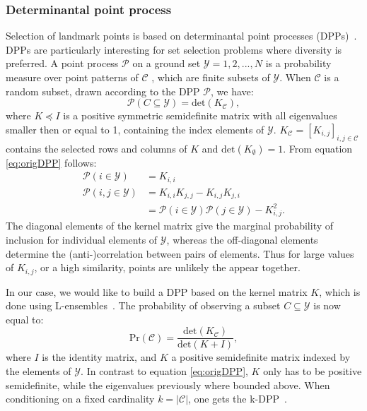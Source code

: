 \documentclass[preprint,12pt]{elsarticle}
\begin{document}
	\subsubsection{Determinantal point process}
	Selection of landmark points is based on determinantal point processes (DPPs)~\cite{kulesza2012determinantal}. DPPs are particularly interesting for set selection problems where diversity is preferred. A point process $\mathcal{P}$ on a ground set $\mathcal{Y} = {1,2,...,N}$ is a probability measure over point patterns of $\mathcal{C}$ , which are finite subsets of $\mathcal{Y}$. When $\mathcal{C}$ is a random subset, drawn according to the DPP $\mathcal{P}$, we have:
	\begin{equation}
	\label{eq:origDPP}
	\mathcal{P}(C \subseteq \mathcal{Y}) = \mathrm{det}(K_{\mathcal{C}}),
	\end{equation}
	where $K \preceq I$ is a positive symmetric semidefinite matrix with all eigenvalues smaller then or equal to 1, containing the index elements of $\mathcal{Y}$. $K_{\mathcal{C}} = [K_{i,j}]_{i,j \in \mathcal{C}}$ contains the selected rows and columns of $K$ and $\mathrm{det}(K_{\emptyset}) = 1$. From equation \eqref{eq:origDPP} follows:
	\begin{align}
	\mathcal{P}(i \in \mathcal{Y}) &= K_{i,i} \\
	\mathcal{P}(i,j \in \mathcal{Y}) &= K_{i,i}K_{j,j} - K_{i,j}K_{j,i}\\
	\label{eq:KDPP}
	&= \mathcal{P}(i \in \mathcal{Y})\mathcal{P}(j \in \mathcal{Y}) - K_{i,j}^2.
	\end{align}
	The diagonal elements of the kernel matrix give the marginal probability of inclusion for individual elements of $\mathcal{Y}$, whereas the off-diagonal elements determine the (anti-)correlation between pairs of elements. Thus for large values of $K_{i,j}$, or a high similarity, points are unlikely the appear together. 
	
	In our case, we would like to build a DPP based on the kernel matrix $K$, which is done using L-ensembles~\cite{borodin2009determinantal}. The probability of observing a subset $C \subseteq \mathcal{Y}$ is now equal to:
	\begin{equation}
	\mathrm{Pr}(\mathcal{C}) = \frac{\mathrm{det}(K_{\mathcal{C}})}{\mathrm{det}(K + I)},
	\end{equation}
	where $I$ is the identity matrix, and $K$ a positive semidefinite matrix  indexed by the elements of $\mathcal{Y}$. In contrast to equation \eqref{eq:origDPP}, $K$ only has to be positive semidefinite, while the eigenvalues previously where bounded above. When conditioning on a fixed cardinality $k = |\mathcal{C}|$, one gets the k-DPP~\cite{kulesza2011k}.
	
\end{document}
